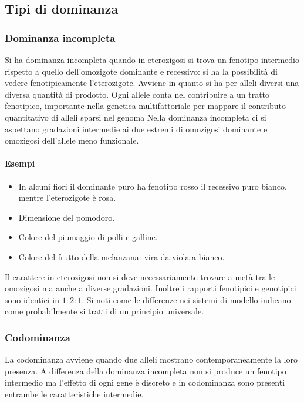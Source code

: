 \subsection{Tipi di dominanza}
\subsubsection{Dominanza incompleta}
Si ha dominanza incompleta quando in eterozigosi si trova un fenotipo intermedio rispetto a quello dell'omozigote dominante e recessivo: si ha la possibilit\`a di vedere fenotipicamente l'eterozigote.  
Avviene in quanto si ha per alleli diversi una diversa quantit\`a di prodotto. Ogni allele conta nel contribuire a un tratto fenotipico, importante nella genetica multifattoriale per mappare il contributo
quantitativo di alleli sparsi nel genoma  Nella dominanza incompleta ci si aspettano gradazioni intermedie ai due estremi di omozigosi dominante e omozigosi dell'allele meno funzionale. 
\paragraph{Esempi}
\begin{itemize}
	\item In alcuni fiori il dominante puro ha fenotipo rosso il recessivo puro bianco, mentre l'eterozigote \`e rosa.
	\item Dimensione del pomodoro.
	\item Colore del piumaggio di polli e galline.
	\item Colore del frutto della melanzana: vira da viola a bianco.
\end{itemize}
Il carattere in eterozigosi non si deve necessariamente trovare a met\`a tra le omozigosi ma anche a diverse gradazioni. Inoltre i rapporti fenotipici e genotipici sono identici in $1:2:1$. 
Si noti come le differenze nei sistemi di modello indicano come probabilmente si tratti di un principio universale. 
\subsubsection{Codominanza}
La codominanza avviene quando due alleli mostrano contemporaneamente la loro presenza. A differenza della dominanza incompleta non si produce un fenotipo intermedio ma l'effetto di 
ogni gene \`e discreto e in codominanza sono presenti entrambe le caratteristiche intermedie.
